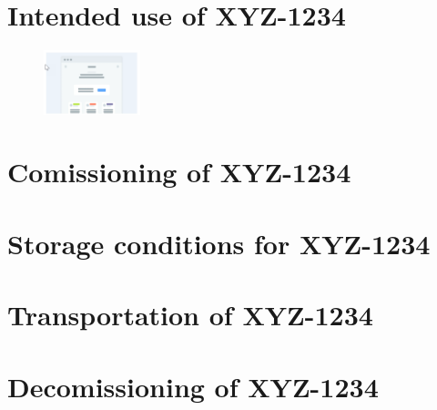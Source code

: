 \documentclass[oneside]{book}
\newcommand{\productname}{\uppercase{\textbf{XYZ-1234}}}
\begin{document}
\chapter{Intended use of \productname}
\blindtext
\begin{figure}
	\centering
		\includegraphics[width=0.25\textwidth]{wireframe.png}
\end{figure}
\blindtext[4]
\chapter{Comissioning of \productname}
\blindtext[4]
\chapter{Storage conditions for \productname}
\blindtext[4]
\chapter{Transportation of \productname}
\blindtext[4]
\chapter{Decomissioning of \productname}
\blindtext[4]
\end{document}

